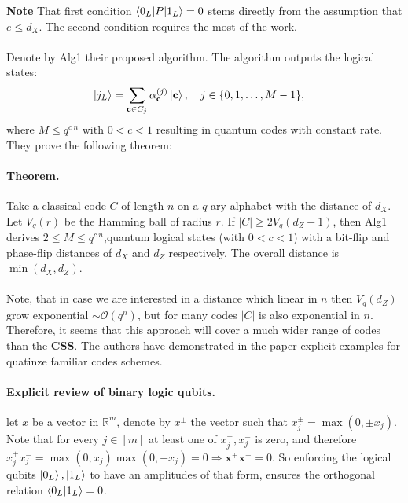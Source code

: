 \documentclass{article}
\begin{document}
\textbf{Note} That first condition \( \braket{0_L|P|1_L} = 0 \) stems directly from the assumption that \( e \le d_X \). The second condition requires the most of the work.   

\paragraph{}
 
Denote by Alg1 their proposed algorithm. The algorithm outputs the logical states:
\begin{align}
    \ket{j_L} &= \sum_{{\bf c} \in C_j}  \alpha^{(j)}_{\bf c}\ket{\bf c} , \quad 
    j\in\{0,1,\dots,M-1\} , \label{formM}
\end{align}
where \(M\le q^{c\:n}\) with \(0<c<1\) resulting in quantum codes with constant rate. They prove the following theorem:

\paragraph{Theorem.}
Take a classical code \(C\) of length \(n\) on a \(q\)-ary alphabet with 
the distance of $d_X$. Let $V_{q}(r)$ be the Hamming ball of radius \(r\). If  \(|C|\ge 2V_{q}(d_Z-1)\), then Alg1 derives  \(2 \le M\le q^{c\:n}\),quantum logical states (with \(0<c<1\))  with a bit-flip and phase-flip  distances of \(d_X\) and \(d_Z\) respectively. The overall  distance is \(\min(d_X,d_Z)\).

\paragraph{}
Note, that in case we are interested in a distance which linear in \(n\) then  \(V_{q}(d_Z)\) grow exponential \( \sim \mathcal{O}(q^n) \), but for many codes \( |C| \) is also exponential in \( n\). Therefore, it seems that this approach will cover a much wider range of codes than the \textbf{CSS}. The authors have demonstrated in the paper explicit examples for quatinze familiar codes schemes.   
\paragraph{Explicit review of binary logic qubits.} let \(x\) be a vector in \(  \mathbb{R}^m\), denote by \(x^{\pm}\) the vector such that \(x^{\pm}_{j} = \max (0, \pm x_j )\). Note that for every \(j\in [m]\) at least one of \(x^{+}_j, x^{-}_j\) is zero, and therefore \( x^{+}_jx^{-}_j = \max (0, x_j )\max (0, - x_j ) = 0 \Rightarrow \mathbf{x^{+}}\mathbf{x^{-}} = 0 \). So enforcing the logical qubits \( \ket{0_L}, \ket{1_L} \) to have an amplitudes of that form, ensures the orthogonal relation \( \braket{0_L | 1_L } = 0\).
\end{document}
